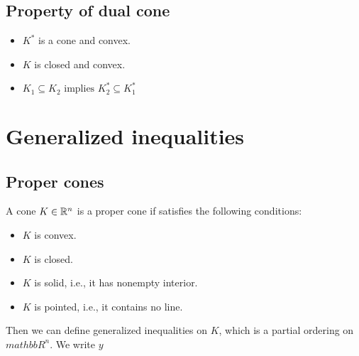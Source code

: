 \subsection{Property of dual cone}
\begin{itemize}
  \item $K^*$ is a cone and convex.
  \item $K$ is closed and convex.
  \item $K_1 \subseteq K_2 \text{ implies } K_2^* \subseteq K_1^* $

\end{itemize}

\section{Generalized inequalities}
\subsection{Proper cones}
\begin{defn}
A cone $K \in \mathbb{R}^n$ is a proper cone if satisfies the following 
conditions:
  \begin{itemize}
    \item $K$ is convex.
    \item $K$ is closed.
    \item $K$ is solid, i.e., it has nonempty interior.
    \item $K$ is pointed, i.e., it contains no line.
  \end{itemize}
\end{defn}
Then we can define generalized inequalities on $K$, which is a partial 
ordering on $mathbb{R}^n$. We write $y$
